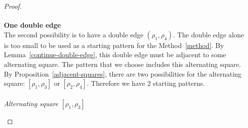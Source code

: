 \begin{proof}
\paragraph{}
\textbf{One double edge}\\
The second possibility is to have a double edge $(\rho_1, \rho_4)$. The double edge alone is too small to be used as a starting pattern for the Method~\ref{method}. By Lemma~\ref{continue-double-edge}, this double edge must be adjacent to some alternating square. The pattern that we choose includes this alternating square. By Proposition~\ref{adjacent-squares}, there are two possibilities for the alternating square: $[\rho_1, \rho_3]$ or $[\rho_2, \rho_4]$. Therefore we have 2 starting patterns.

\paragraph{}
\textit{Alternating square $[\rho_1, \rho_3]$}

\begin{figure}[H]
  \begin{center}
    \caption{}
    \label{proof-5-12}
  \end{center}
\end{figure}


\end{proof}
